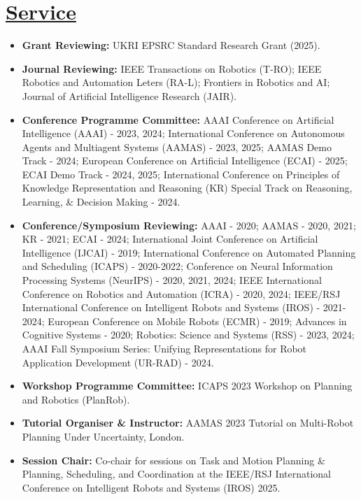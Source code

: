\documentclass[11pt]{article}
\begin{document}
\section*{\underline{Service}}
\begin{itemize}
\item \textbf{Grant Reviewing:} UKRI EPSRC Standard Research Grant (2025).
\item \textbf{Journal Reviewing:} IEEE Transactions on Robotics (T-RO); IEEE Robotics and Automation Leters (RA-L); Frontiers in Robotics and AI; Journal of Artificial Intelligence Research (JAIR).
\item \textbf{Conference Programme Committee:}  AAAI Conference on Artificial Intelligence (AAAI) - 2023, 2024; International Conference on Autonomous Agents and Multiagent Systems (AAMAS) - 2023, 2025; AAMAS Demo Track - 2024; European Conference on Artificial Intelligence (ECAI) - 2025; ECAI Demo Track - 2024, 2025; International Conference on Principles of Knowledge Representation and Reasoning (KR) Special Track on Reasoning, Learning, \& Decision Making - 2024.
\item \textbf{Conference/Symposium Reviewing:} AAAI - 2020; AAMAS - 2020, 2021; KR - 2021; ECAI - 2024; International Joint Conference on Artificial Intelligence (IJCAI) - 2019; International Conference on Automated Planning and Scheduling (ICAPS) - 2020-2022; Conference on Neural Information Processing Systems (NeurIPS) - 2020, 2021, 2024; IEEE International Conference on Robotics and Automation (ICRA) - 2020, 2024; IEEE/RSJ International Conference on Intelligent Robots and Systems (IROS) - 2021-2024; European Conference on Mobile Robots (ECMR) - 2019; Advances in Cognitive Systems - 2020;  Robotics: Science and Systems (RSS) - 2023, 2024; AAAI Fall Symposium Series: Unifying Representations for Robot Application Development (UR-RAD) - 2024.
\item\textbf{Workshop Programme Committee:} ICAPS 2023 Workshop on Planning and Robotics (PlanRob).
\item \textbf{Tutorial Organiser \& Instructor:} AAMAS 2023 Tutorial on Multi-Robot Planning Under Uncertainty, London.
\item \textbf{Session Chair:} Co-chair for sessions on Task and Motion Planning \& Planning, Scheduling, and Coordination at the IEEE/RSJ International Conference on Intelligent Robots and Systems (IROS) 2025.
\end{itemize}
\end{document}
